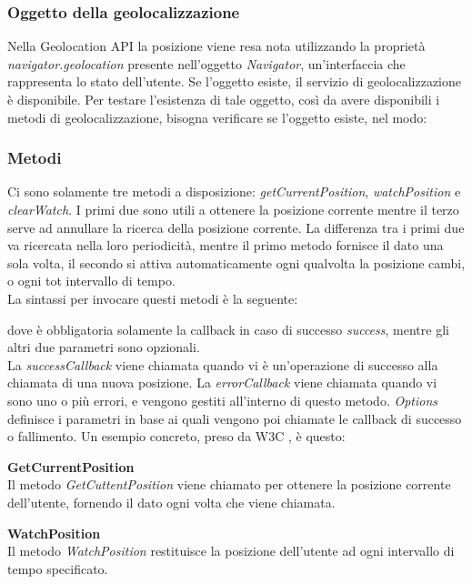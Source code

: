 \documentclass[11pt ,a4paper , twoside , openright ]{article}
\begin{document}
\subsubsection{Oggetto della geolocalizzazione}
Nella Geolocation API la posizione viene resa nota utilizzando la proprietà \textit{navigator.geolocation} \cite{rif4} presente nell'oggetto \textit{Navigator}, un'interfaccia che rappresenta lo stato dell'utente. Se l'oggetto esiste, il servizio di geolocalizzazione è disponibile. Per testare l'esistenza di tale oggetto, così da avere disponibili i metodi di geolocalizzazione, bisogna verificare se l'oggetto esiste, nel modo:


\subsubsection{Metodi}
Ci sono solamente tre metodi a disposizione: \textit{getCurrentPosition}, \textit{watchPosition} e \textit{clearWatch}. I primi due sono utili a ottenere la posizione corrente mentre il terzo serve ad annullare la ricerca della posizione corrente. 
La differenza tra i primi due va ricercata nella loro periodicità, mentre il primo metodo fornisce il dato una sola volta, il secondo si attiva automaticamente ogni qualvolta la posizione cambi, o ogni tot intervallo di tempo.
\\
La sintassi per invocare questi metodi è la seguente:

dove è obbligatoria solamente la callback in caso di successo \textit{success}, mentre gli altri due parametri sono opzionali.
\\
La \textit{successCallback} viene chiamata quando vi è un'operazione di successo alla chiamata di una nuova posizione.
La \textit{errorCallback} viene chiamata quando vi sono uno o più errori, e vengono gestiti all'interno di questo metodo.
\textit{Options} definisce i parametri in base ai quali vengono poi chiamate le callback di successo o fallimento.
Un esempio concreto, preso da W3C \cite{rif5}, è questo:
\pagebreak
 

\textbf{GetCurrentPosition}
\\
Il metodo \textit{GetCuttentPosition} viene chiamato per ottenere la posizione corrente dell'utente, fornendo il dato ogni volta che viene chiamata.

\textbf{WatchPosition}
\\
Il metodo \textit{WatchPosition} restituisce la posizione dell'utente ad ogni intervallo di tempo specificato.
\end{document}
